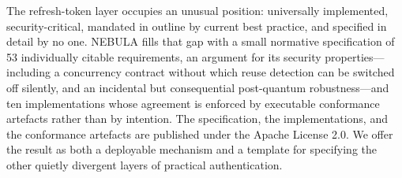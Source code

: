 \documentclass[11pt]{article}
\begin{document}
The refresh-token layer occupies an unusual position: universally
implemented, security-critical, mandated in outline by current best practice,
and specified in detail by no one. NEBULA fills that gap with a small
normative specification of 53 individually citable requirements, an argument
for its security properties---including a concurrency contract without which
reuse detection can be switched off silently, and an incidental but
consequential post-quantum robustness---and ten implementations whose
agreement is enforced by executable conformance artefacts rather than by
intention. The specification, the implementations, and the conformance
artefacts are published under the Apache License 2.0. We offer the result as
both a deployable mechanism and a template for specifying the other quietly
divergent layers of practical authentication.
\end{document}
